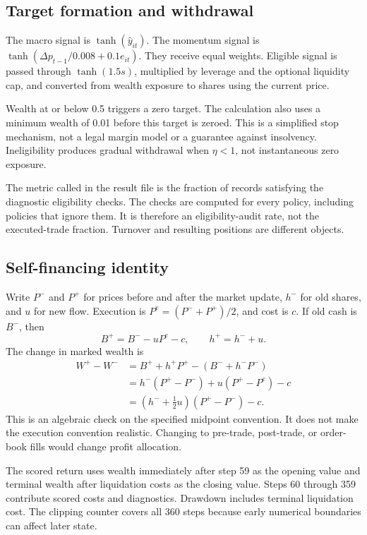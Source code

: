 \subsection{Target formation and withdrawal}
The macro signal is $\tanh(\widehat y_{it})$. The momentum signal is $\tanh(\Delta p_{t-1}/0.008+0.1e_{it})$. They receive equal weights. Eligible signal is passed through $\tanh(1.5s)$, multiplied by leverage and the optional liquidity cap, and converted from wealth exposure to shares using the current price.

Wealth at or below 0.5 triggers a zero target. The calculation also uses a minimum wealth of 0.01 before this target is zeroed. This is a simplified stop mechanism, not a legal margin model or a guarantee against insolvency. Ineligibility produces gradual withdrawal when $\eta<1$, not instantaneous zero exposure.

The metric called  in the result file is the fraction of records satisfying the diagnostic eligibility checks. The checks are computed for every policy, including policies that ignore them. It is therefore an eligibility-audit rate, not the executed-trade fraction. Turnover and resulting positions are different objects.

\subsection{Self-financing identity}
Write $P^-$ and $P^+$ for prices before and after the market update, $h^-$ for old shares, and $u$ for new flow. Execution is $P^e=(P^-+P^+)/2$, and cost is $c$. If old cash is $B^-$, then
\[
B^+=B^- -uP^e-c,\qquad h^+=h^-+u.
\]
The change in marked wealth is
\begin{align*}
W^+-W^-&=B^++h^+P^+-(B^-+h^-P^-)\\
&=h^-(P^+-P^-)+u(P^+-P^e)-c\\
&=(h^-+\tfrac12u)(P^+-P^-)-c.
\end{align*}
This is an algebraic check on the specified midpoint convention. It does not make the execution convention realistic. Changing to pre-trade, post-trade, or order-book fills would change profit allocation.

The scored return uses wealth immediately after step 59 as the opening value and terminal wealth after liquidation costs as the closing value. Steps 60 through 359 contribute scored costs and diagnostics. Drawdown includes terminal liquidation cost. The clipping counter covers all 360 steps because early numerical boundaries can affect later state.

